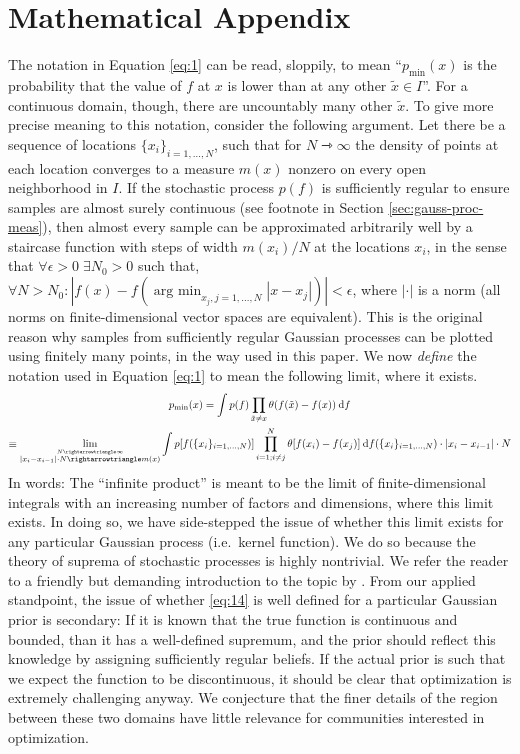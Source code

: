 \documentclass[twoside,11pt]{article}
\renewcommand{\d}{\:\mathrm{d}}
\newcommand{\pmin}{p_{\min}}
\newcommand{\argmin}{\operatorname*{arg\: min}}
\renewcommand{\to}{\rightarrowtriangle}
\begin{document}
\appendix

\section{Mathematical Appendix}
\label{sec:math-append}

The notation in Equation \eqref{eq:1} can be read, sloppily, to mean
``$\pmin(x)$ is the probability that the value of $f$ at $x$ is lower
than at any other $\tilde{x}\in I$''. For a continuous domain, though,
there are uncountably many other $\tilde{x}$. To give more precise
meaning to this notation, consider the following argument. Let there
be a sequence of locations $\{x_i\}_{i=1,\dots,N}$, such that for
$N\to\infty$ the density of points at each location converges to a
measure $m(x)$ nonzero on every open neighborhood in $I$. If the
stochastic process $p(f)$ is sufficiently regular to ensure samples
are almost surely continuous (see footnote in Section
\ref{sec:gauss-proc-meas}), then almost every sample can be
approximated arbitrarily well by a staircase function with steps of
width $m(x_i)/N$ at the locations $x_i$, in the sense that $\forall
\epsilon > 0\; \exists N_0>0$ such that, $\forall N>N_0 :
|f(x)-f(\argmin_{x_j, j=1,\dots,N} |x-x_j|)| < \epsilon$, where
$|\cdot|$ is a norm (all norms on finite-dimensional vector spaces are
equivalent). This is the original reason why samples from sufficiently
regular Gaussian processes can be plotted using finitely many points,
in the way used in this paper. We now \emph{define} the notation used
in Equation \eqref{eq:1} to mean the following limit, where it exists.
\begin{multline}
  \label{eq:14}\raisetag{2cm}
  \pmin(x) = \int p(f) \prod_{\tilde{x} \neq x} \theta(f(\tilde{x})-f(x)) \d f \\
  \equiv \lim_{\stackrel{N \to \infty}{|x_i-x_{i-1}| \cdot N\to m(x)}}
  \int p[f(\{x_i\}_{i=1,\dots,N})] \prod_{i=1; i\neq j} ^N \theta [
  f(x_i) - f(x_j) ] \d f(\{x_i\}_{i=1,\dots,N}) \cdot |x_i-x_{i-1}|
  \cdot N
\end{multline}
In words: The ``infinite product'' is meant to be the limit of
finite-dimensional integrals with an increasing number of factors and
dimensions, where this limit exists. In doing so, we have side-stepped
the issue of whether this limit exists for any particular Gaussian
process (i.e.\ kernel function). We do so because the theory of
suprema of stochastic processes is highly nontrivial. We refer the
reader to a friendly but demanding introduction to the topic by
\citet{AdlerSuprema}. From our applied standpoint, the issue of
whether \eqref{eq:14} is well defined for a particular Gaussian prior
is secondary: If it is known that the true function is continuous and
bounded, than it has a well-defined supremum, and the prior should
reflect this knowledge by assigning sufficiently regular beliefs. If
the actual prior is such that we expect the function to be
discontinuous, it should be clear that optimization is extremely
challenging anyway. We conjecture that the finer details of the region
between these two domains have little relevance for communities
interested in optimization.


\end{document}
